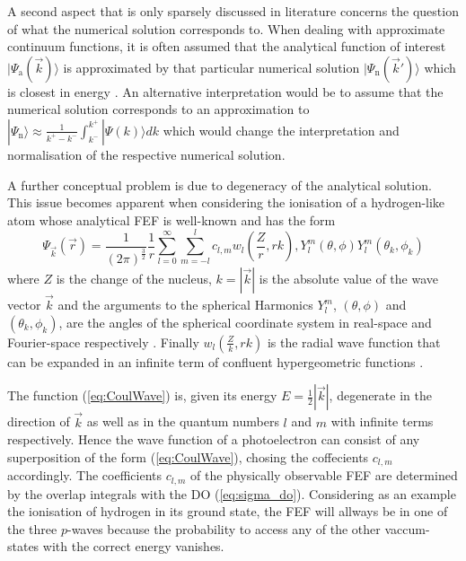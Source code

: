 A second aspect that is only sparsely discussed in literature concerns the question of what the numerical solution corresponds to.
When dealing with approximate continuum functions, it is often assumed that the analytical function of interest $|\Psi_\text{a}(\vec{k})\rangle$ is approximated by that particular numerical solution $|\Psi_\text{n}(\vec{k}')\rangle$ which is closest in energy \cite{H2pDeCleva}.
An alternative interpretation would be to assume that the numerical solution corresponds to an approximation to $|\Psi_\text{n}\rangle \approx \frac{1}{k^+-k^-} \int_{k^-}^{k^+}|\Psi(k) \rangle dk$ which would change the interpretation and normalisation of the respective numerical solution.
%

A further conceptual problem is due to degeneracy of the analytical solution.
This issue becomes apparent when considering the ionisation of a hydrogen-like atom whose analytical FEF is well-known and has the form
%
\begin{equation} \label{eq:CoulWave}
\Psi_{\vec{k}}(\vec{r})=\frac{1}{(2\pi)^{\frac{3}{2}}}\frac 1r
\sum_{l=0}^\infty \sum_{m=-l}^l c_{l,m} w_l\left(\frac Zr,rk\right), Y_l^m\left(\theta, \phi\right) Y_l^m\left(\theta_k, \phi_k\right)
\end{equation}
where $Z$ is the change of the nucleus, $k=|\vec{k}|$ is the absolute value of the wave vector $\vec{k}$ and the arguments to the spherical Harmonics $Y_l^m$, $(\theta,\phi)$ and $(\theta_k,\phi_k)$, are the angles of the spherical coordinate system in real-space and Fourier-space respectively \cite{ezDyson}.
Finally $w_l\left(\frac{Z}{k}, rk\right)$ is the radial wave function that can be expanded in an infinite term of confluent hypergeometric functions \cite{Lifschitz}.

The function (\ref{eq:CoulWave}) is, given its energy $E=\frac 12 |\vec{k}|$, degenerate in the direction of $\vec{k}$ as well as in the quantum numbers $l$ and $m$ with infinite terms respectively.
Hence the wave function of a photoelectron can consist of any superposition of the form (\ref{eq:CoulWave}), chosing the coffecients $c_{l,m}$ accordingly.
The coefficients $c_{l,m}$ of the physically observable FEF are determined by the overlap integrals with the DO (\ref{eq:sigma_do}).  
Considering as an example the ionisation of hydrogen in its ground state, the FEF will allways be in one of the three $p$-waves because the probability to access any of the other vaccum-states with the correct energy vanishes. 

